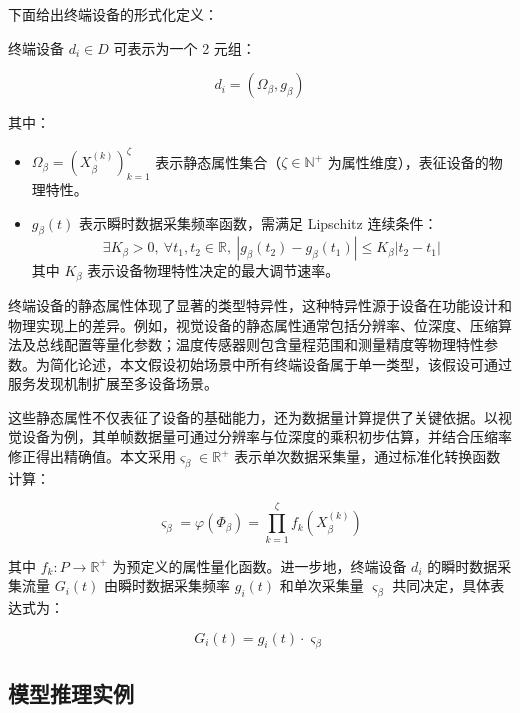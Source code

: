 下面给出终端设备的形式化定义：

\begin{definition}[终端设备]
\label{def:device}
终端设备 $d_i \in D$ 可表示为一个 2 元组：
\end{definition}

$$
d_i = (\Omega_\beta, g_\beta)
$$

其中：
\begin{itemize}
    \item $\Omega_\beta = (X^{(k)}_\beta)_{k=1}^{\zeta}$ 表示静态属性集合（$\zeta \in \mathbb{N}^+$ 为属性维度），表征设备的物理特性。
    \item $g_\beta(t)$ 表示瞬时数据采集频率函数，需满足 Lipschitz 连续条件：
        \begin{equation}
        \exists K_\beta > 0,\ \forall t_1, t_2 \in \mathbb{R},\ |g_\beta(t_2) - g_\beta(t_1)| \leq K_\beta |t_2 - t_1|
        \end{equation}
        其中 $K_\beta$ 表示设备物理特性决定的最大调节速率。
\end{itemize}

终端设备的静态属性体现了显著的类型特异性，这种特异性源于设备在功能设计和物理实现上的差异。例如，视觉设备的静态属性通常包括分辨率、位深度、压缩算法及总线配置等量化参数；温度传感器则包含量程范围和测量精度等物理特性参数。为简化论述，本文假设初始场景中所有终端设备属于单一类型，该假设可通过服务发现机制扩展至多设备场景。

这些静态属性不仅表征了设备的基础能力，还为数据量计算提供了关键依据。以视觉设备为例，其单帧数据量可通过分辨率与位深度的乘积初步估算，并结合压缩率修正得出精确值。本文采用$\varsigma_\beta \in \mathbb{R}^+$ 表示单次数据采集量，通过标准化转换函数计算：

\begin{equation}
\varsigma_\beta = \varphi(\Phi_\beta) = \prod_{k=1}^{\zeta} f_k(X^{(k)}_\beta)
\end{equation}

其中 $f_k: P \to \mathbb{R}^+$ 为预定义的属性量化函数。进一步地，终端设备 $d_i$ 的瞬时数据采集流量 $G_i(t)$ 由瞬时数据采集频率 $g_i(t)$ 和单次采集量 $\varsigma_\beta$ 共同决定，具体表达式为：

\begin{equation}
G_i(t) = g_i(t) \cdot \varsigma_\beta
\end{equation}

\subsection{模型推理实例}

